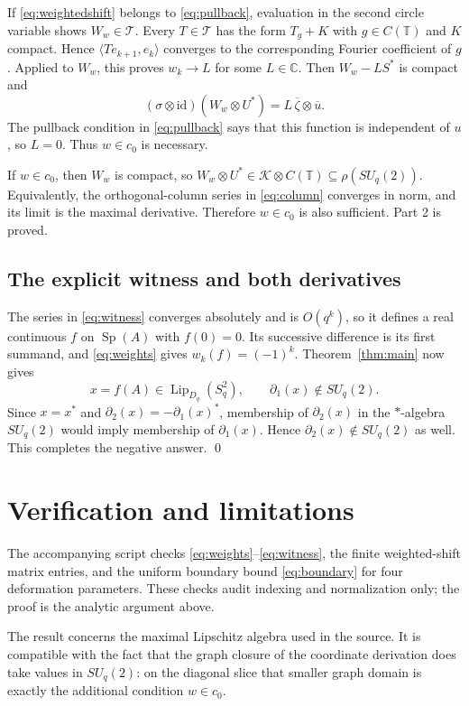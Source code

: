 \documentclass[11pt]{article}
\newcommand{\C}{\mathbb C}
\newcommand{\T}{\mathbb T}
\newcommand{\K}{\mathcal K}
\newcommand{\Lip}{\operatorname{Lip}}
\newcommand{\SU}{SU_q(2)}
\newcommand{\Sq}{S_q^2}
\numberwithin{equation}{section}
\begin{document}
If \eqref{eq:weightedshift} belongs to \eqref{eq:pullback}, evaluation in the
second circle variable shows
$W_w\in\mathcal T$.  Every $T\in\mathcal T$ has the form $T_g+K$ with
$g\in C(\T)$ and $K$ compact.  Hence
$\langle Te_{k+1},e_k\rangle$ converges to the corresponding Fourier
coefficient of $g$.  Applied to $W_w$, this proves $w_k\to L$ for some
$L\in\C$.  Then $W_w-LS^*$ is compact and
\begin{equation}
 (\sigma\otimes\mathrm{id})(W_w\otimes U^*)
       =L\,\overline\zeta\otimes\overline u.                   \label{eq:quotient}
\end{equation}
The pullback condition in \eqref{eq:pullback} says that this function is independent of
$u$, so $L=0$.  Thus $w\in c_0$ is necessary.

If $w\in c_0$, then $W_w$ is compact, so
$W_w\otimes U^*\in\K\otimes C(\T)\subseteq\rho(\SU)$.  Equivalently, the
orthogonal-column series in \eqref{eq:column} converges in norm, and its limit is the
maximal derivative.  Therefore $w\in c_0$ is also sufficient.  Part 2 is
proved.

\subsection*{The explicit witness and both derivatives}

The series in \eqref{eq:witness} converges absolutely and is $O(q^k)$, so it defines a
real continuous $f$ on $\operatorname{Sp}(A)$ with $f(0)=0$.  Its successive
difference is its first summand, and \eqref{eq:weights} gives
$w_k(f)=(-1)^k$.  Theorem~\ref{thm:main} now gives
\[
 x=f(A)\in\Lip_{D_q}(\Sq),\qquad \partial_1(x)\notin\SU.
\]
Since $x=x^*$ and $\partial_2(x)=-\partial_1(x)^*$, membership of
$\partial_2(x)$ in the $*$-algebra $\SU$ would imply membership of
$\partial_1(x)$.  Hence $\partial_2(x)\notin\SU$ as well.  This completes
the negative answer. \qed

\section{Verification and limitations}

The accompanying script checks \eqref{eq:weights}--\eqref{eq:witness}, the finite weighted-shift
matrix entries, and the uniform boundary bound \eqref{eq:boundary} for four deformation
parameters.  These checks audit indexing and normalization only; the proof is
the analytic argument above.

The result concerns the maximal Lipschitz algebra used in the source.  It is
compatible with the fact that the graph closure of the coordinate derivation
does take values in $\SU$: on the diagonal slice that smaller graph domain is
exactly the additional condition $w\in c_0$.
\end{document}
